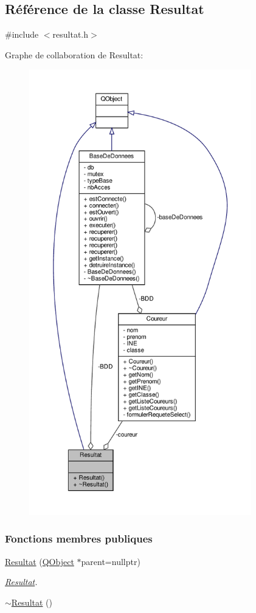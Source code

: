 \hypertarget{class_resultat}{}\subsection{Référence de la classe Resultat}
\label{class_resultat}


{\ttfamily \#include $<$resultat.\+h$>$}



Graphe de collaboration de Resultat\+:\nopagebreak
\begin{figure}[H]
\begin{center}
\leavevmode
\includegraphics[height=550pt]{class_resultat__coll__graph}
\end{center}
\end{figure}
\subsubsection*{Fonctions membres publiques}
\begin{DoxyCompactItemize}
\item 
\hyperlink{class_resultat_a57e458f7abfc7463786ae9212bf55cd5}{Resultat} (\hyperlink{class_q_object}{Q\+Object} $\ast$parent=nullptr)
\begin{DoxyCompactList}\small\item\em \hyperlink{class_resultat}{Resultat}. \end{DoxyCompactList}\item 
\hyperlink{class_resultat_ae159333a3c5b89b8f307086bac618d7c}{$\sim$\+Resultat} ()
\end{DoxyCompactItemize}
